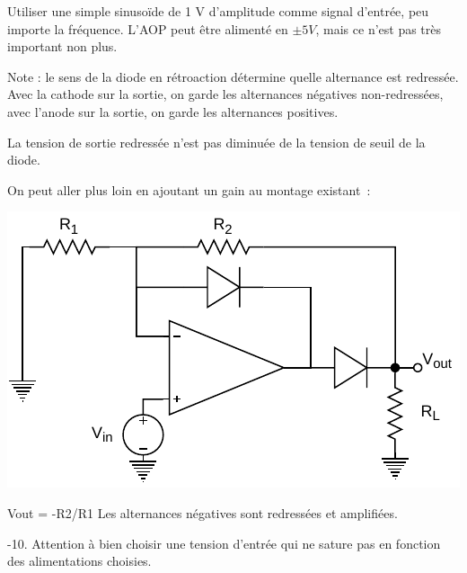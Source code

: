 \documentclass{../../template/labo}
\begin{document}
{
Utiliser une simple sinusoïde de 1 V d'amplitude comme signal d'entrée, peu importe la fréquence.
L'AOP peut être alimenté en $\pm5 V$, mais ce n'est pas très important non plus.

Note : le sens de la diode en rétroaction détermine quelle alternance est redressée. Avec la cathode sur la sortie, on garde les alternances négatives non-redressées, avec l'anode sur la sortie, on garde les alternances positives.
}

{
La tension de sortie redressée n'est pas diminuée de la tension de seuil de la diode.
}


On peut aller plus loin en ajoutant un gain au montage existant~:
\begin{center}
	\includegraphics[width=.7\textwidth]{precision-rectifier-gain.pdf}
\end{center}

{
Vout = -R2/R1
Les alternances négatives sont redressées et amplifiées.
}

{
-10.
Attention à bien choisir une tension d'entrée qui ne sature pas en fonction des alimentations choisies.
}
\end{document}
